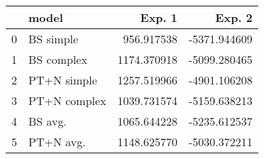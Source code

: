 \begin{tabular}{llrr}
\toprule
{} &         model &       Exp. 1 &       Exp. 2 \\
\midrule
0 &     BS simple &   956.917538 & -5371.944609 \\
1 &    BS complex &  1174.370918 & -5099.280465 \\
2 &   PT+N simple &  1257.519966 & -4901.106208 \\
3 &  PT+N complex &  1039.731574 & -5159.638213 \\
4 &       BS avg. &  1065.644228 & -5235.612537 \\
5 &     PT+N avg. &  1148.625770 & -5030.372211 \\
\bottomrule
\end{tabular}
